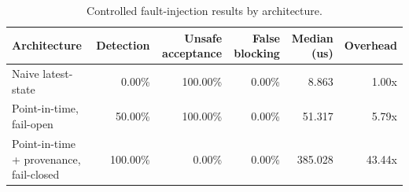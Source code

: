 \begin{table}[htbp]
\centering
\caption{Controlled fault-injection results by architecture.}
\label{tab:arm-metrics}
\begin{tabular}{lrrrrr}
\hline
Architecture & Detection & Unsafe acceptance & False blocking & Median (us) & Overhead \\
\hline
Naive latest-state & 0.00\% & 100.00\% & 0.00\% & 8.863 & 1.00x \\
Point-in-time, fail-open & 50.00\% & 100.00\% & 0.00\% & 51.317 & 5.79x \\
Point-in-time + provenance, fail-closed & 100.00\% & 0.00\% & 0.00\% & 385.028 & 43.44x \\
\hline
\end{tabular}
\end{table}
